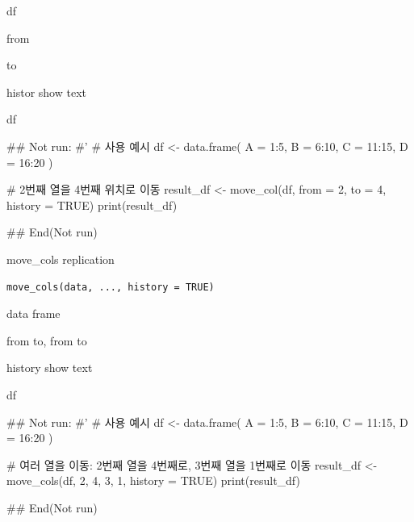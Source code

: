 \documentclass[a4paper]{book}
\begin{document}
%
\begin{Arguments}
\begin{ldescription}
\item[\code{data}] df

\item[\code{from}] from

\item[\code{to}] to

\item[\code{history}] histor show text
\end{ldescription}
\end{Arguments}
%
\begin{Value}
df
\end{Value}
%
\begin{Examples}
\begin{ExampleCode}
## Not run: 
#'
# 사용 예시
df <- data.frame(
  A = 1:5,
  B = 6:10,
  C = 11:15,
  D = 16:20
)

# 2번째 열을 4번째 위치로 이동
result_df <- move_col(df, from = 2, to = 4, history = TRUE)
print(result_df)


## End(Not run)

\end{ExampleCode}
\end{Examples}
%
\begin{Description}
move\_cols replication
\end{Description}
%
\begin{Usage}
\begin{verbatim}
move_cols(data, ..., history = TRUE)
\end{verbatim}
\end{Usage}
%
\begin{Arguments}
\begin{ldescription}
\item[\code{data}] data frame

\item[\code{...}] from to, from to

\item[\code{history}] history show text
\end{ldescription}
\end{Arguments}
%
\begin{Value}
df
\end{Value}
%
\begin{Examples}
\begin{ExampleCode}
## Not run: 
#'
# 사용 예시
df <- data.frame(
  A = 1:5,
  B = 6:10,
  C = 11:15,
  D = 16:20
)

# 여러 열을 이동: 2번째 열을 4번째로, 3번째 열을 1번째로 이동
result_df <- move_cols(df, 2, 4, 3, 1, history = TRUE)
print(result_df)


## End(Not run)

\end{ExampleCode}
\end{Examples}
\end{document}

